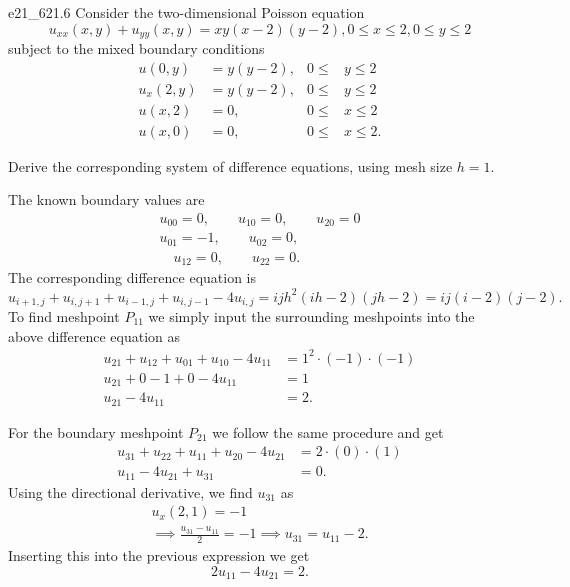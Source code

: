 
\begin{problemwithimage}{e21_6}{21.6}
  Consider the two-dimensional Poisson equation
  \begin{equation*}
    u_{x x}(x,y) + u_{yy}(x,y) = xy(x-2) (y-2), 0 \leq x \leq 2, 0\leq y \leq 2
  \end{equation*}
  subject to the mixed boundary conditions
  \begin{align*}
    u(0,y) &= y(y-2), & 0 \leq  &y\leq 2 \\
    u_x(2,y) &= y(y-2), & 0\leq &y \leq 2 \\
    u(x,2) &= 0, & 0 \leq &x \leq 2 \\
    u(x,0) &= 0, & 0 \leq &x \leq 2
  .\end{align*}

  Derive the corresponding system of difference equations, using mesh size $h = 1$.
\end{problemwithimage}

\begin{derivation}
  The known boundary values are
  \begin{gather*}
    u_{00} = 0, \qquad  u_{10} = 0, \qquad  u_{20} = 0\\
     u_{01} = -1, \qquad  u_{02} = 0,  \\
           \quad u_{12} = 0, \qquad  u_{22} = 0. 
  \end{gather*}
  The corresponding difference equation is
  \begin{equation*}
    u_{i+1,j} + u_{i,j+1} + u_{i-1, j} + u_{i, j-1} - 4u_{i,j} = ij h^2 (ih - 2) (jh - 2) = ij (i-2) (j - 2)
  .\end{equation*}
  To find meshpoint $P_{11}$ we simply input the surrounding meshpoints into the above difference equation as
  \begin{align*}
    u_{21} + u_{12} + u_{01} + u_{10} - 4u_{11} &= 1^2 \cdot (-1) \cdot (-1) \\
    u_{21} + 0 -1 + 0 - 4u_{11} &= 1 \\
    u_{21} - 4u_{11} &= 2
  .\end{align*}
  
  For the boundary meshpoint $P_{21}$ we follow the same procedure and get
  \begin{align*}
    u_{31} + u_{22} + u_{11} + u_{20} - 4u_{21} &= 2 \cdot (0) \cdot (1) \\
    u_{11} - 4u_{21} + u_{31} &= 0
  .\end{align*}
  Using the directional derivative, we find $u_{31}$ as
  \begin{gather*}
    u_x(2,1) = -1 \\
    \implies \frac{u_{31} - u_{11}}{2} = -1 \implies u_{31} = u_{11} - 2
  .\end{gather*}
  Inserting this into the previous expression we get
  \begin{equation*}
    2u_{11} - 4u_{21} = 2
  .\end{equation*}
\end{derivation}

